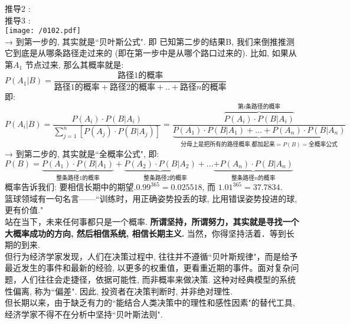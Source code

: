 \documentclass[UTF8]{ctexart}
\begin{document}
推导2 : \\






推导3 : \\
\texttt{[image: /0102.pdf]} \\

→ 到第一步的, 其实就是``贝叶斯公式". 即 已知第二步的结果B, 我们来倒推推测它到底是从哪条路径走过来的 (即在第一步中是从哪个路口过来的). 比如, 如果从第$ A_1$ 节点过来, 那么其概率就是:$
P\left( A_1|B \right) =\dfrac{\text{路径1的概率}}{\text{路径1的概率}+\text{路径2的概率}+..+\text{路径}n\text{的概率}}
$ \\
即: \\
$
P\left( A_i|B \right) =\dfrac{P(A_i)\cdot P(B|A_i)}{\sum_{j=1}^n{\left[ P(A_j)\cdot P(B|A_j) \right]}}=\dfrac{\overset{\text{第}i\text{条路径的概率}}{\overbrace{P(A_i)\cdot P(B|A_i)}}}{\underset{\text{分母上是把所有的路径概率,都加起来}=P(B)=\text{全概率公式}}{\underbrace{P(A_1)\cdot P(B|A_1)+...+P(A_n)\cdot P(B|A_n)}}}
$ \\

→ 到第二步的, 其实就是``全概率公式", 即: \\
$
P(B)=\underset{\text{整条路径1的概率}}{\underbrace{P(A_1)\cdot P(B|A_1)}}+\underset{\text{整条路径2的概率}}{\underbrace{P(A_2)\cdot P(B|A_2)}+}...\underset{\text{整条路径}n\text{的概率}}{\underbrace{+P(A_n)\cdot P(B|A_n)}}
$ \\












概率告诉我们: 要相信长期中的期望.$0.99^{365}=0.025518$, 而 $ 1.01^{365}=37.7834$.   \\
篮球领域有一句名言——``训练时，用正确姿势投丢的球, 比用错误姿势投进的球, 更有价值." \\
站在当下，未来任何事都只是一个概率. \textbf{所谓坚持，所谓努力，其实就是寻找一个大概率成功的方向, 然后相信系统, 相信长期主义.} 当然，你得坚持活着．等到长期的到来.  \\

但行为经济学家发现，人们在决策过程中, 往往并不遵循``贝叶斯规律"，而是给予最近发生的事件和最新的经验, 以更多的权重值，更看重近期的事件。面对复杂问题，人们往往会走捷径，依据可能性, 而非概率来做决策. 这种对经典模型的系统性偏离, 称为``偏差". 因此, 投资者在决策判断时, 并非绝对理性.  \\
但长期以来，由于缺乏有力的``能结合人类决策中的理性和感性因素"的替代工具, 经济学家不得不在分析中坚持``贝叶斯法则".

















	
	
	
\end{document}
